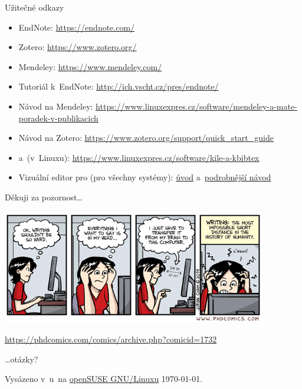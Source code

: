 \documentclass[compress, ucs, xelatex, 11pt, xcolor=svgnames, aspectratio=169,
	hyperref={
		bookmarks=true,
		unicode=true,
		colorlinks=true,
		pdftitle={Citacni software},
		plainpages=false,
		pdfauthor={Vojtech Zeisek},
		pdfsubject={Kratky uvod do citacniho software},
		pdfcreator={XeLaTeX},
		pdfkeywords={citace, reference, software, literatura},
		linkcolor=Crimson, %
		anchorcolor=Magenta, %
		citecolor=Magenta, %
		filecolor=Magenta, %
		menucolor=Magenta, %
		urlcolor=DarkTurquoise, %
		pdftex},
	url={hyphens, lowtilde} %
	]{beamer}
\begin{document}
\begin{frame}{Užitečné odkazy}
	\begin{itemize}
		\item EndNote: \url{https://endnote.com/}
		\item Zotero: \url{https://www.zotero.org/}
		\item Mendeley: \url{https://www.mendeley.com/}
		\item Tutoriál k~EndNote: \url{http://ich.vscht.cz/pres/endnote/}
		\item Návod na Mendeley: \url{https://www.linuxexpres.cz/software/mendeley-a-mate-poradek-v-publikacich}
		\item Návod na Zotero: \url{https://www.zotero.org/support/quick_start_guide}
		\item \BibTeX{ }a~\XeLaTeX{ }(v~Linuxu): \url{https://www.linuxexpres.cz/software/kile-a-kbibtex}
		\item Vizuální editor pro \XeLaTeX{ }(pro všechny systémy): \href{https://www.linuxexpres.cz/software/textovy-editor-lyx-latex-pro-line}{úvod} a~\href{https://www.linuxexpres.cz/praxe/diplomka-lyx}{podrobnější návod}
	\end{itemize}
\end{frame}

\begin{frame}{Děkuji za pozornost\ldots}
	\begin{center}
		\includegraphics[height=5cm]{phdcomics_writing.png}
	\end{center}
	\begin{scriptsize}
		\url{https://phdcomics.com/comics/archive.php?comicid=1732}
	\end{scriptsize}
	\begin{flushright}
		\ldots otázky?
	\end{flushright}
	\begin{tiny}
		Vysázeno v~\XeLaTeX u~na \href{https://www.opensuse.org/}{openSUSE GNU/Linuxu} \today.
	\end{tiny}
\end{frame}
\end{document}
